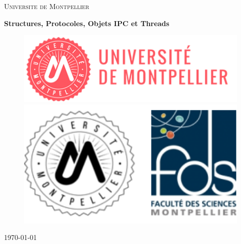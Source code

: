 \documentclass[oneside,13pt,a4paper]{article}
\title{}
\author{

}
\date{\today}
\begin{document}
\begin{titlepage}
	\centering
	{\scshape\LARGE Universite de Montpellier\par}
	{\scshape\Large\par}
	\vspace{1.5cm}
	{\huge\bfseries Structures, Protocoles, Objets IPC et Threads\par}
	\vspace{2cm}
	{\Large\itshape
		
		\par}

		\vspace{2cm}

	\begin{figure}[h]
		\begin{minipage}[c]{.46\linewidth}
			\centering
			\includegraphics[width=1\textwidth]{img/univ-montpellier.png}
		\end{minipage}
		\hfill%
		\begin{minipage}[c]{.46\linewidth}
			\centering
			\includegraphics[width=1\textwidth]{img/fds.png}
		\end{minipage}
	\end{figure}

	\par\vspace{1cm}

	\vfill

	{\large \today\par}
\end{titlepage}
\end{document}
